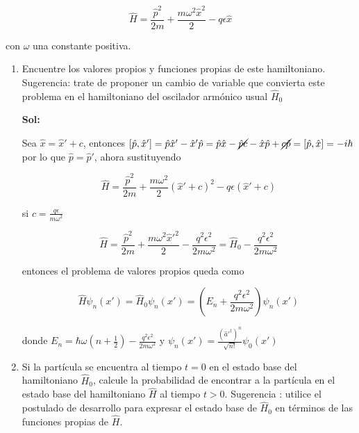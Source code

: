 \documentclass[12pt,a4paper]{article}
\begin{document}
\begin{enumerate}
\begin{equation*}
    \hat{H} = \frac{\hat{p}^2}{2m} + \frac{m \omega^2 \hat{x}^2}{2} - q \epsilon \hat{x}
\end{equation*}

con $\omega$ una constante positiva.

\begin{enumerate}
    \item Encuentre los valores propios y funciones propias de este hamiltoniano. Sugerencia: trate de proponer un cambio de variable que convierta este problema en el hamiltoniano  del oscilador armónico usual $\hat{H}_0$
    
    \textbf{Sol:}
    
    Sea $\hat{x} = \hat{x}' + c$, entonces $[\hat{p},\hat{x}'] = \hat{p}\hat{x}' - \hat{x}'\hat{p} = \hat{p} \hat{x} - \cancel{\hat{p}c} - \hat{x} \hat{p} + \cancel{c\hat{p}} = [\hat{p},\hat{x}] = - i\hbar$ por lo que $\hat{p} = \hat{p}'$, ahora sustituyendo
    
    \begin{equation*}
        \hat{H} = \frac{\hat{p}^2}{2m} + \frac{m \omega^2}{2}(\hat{x}' + c)^2 - q\epsilon (\hat{x}' + c)
    \end{equation*}
    
    si $c= \frac{q \epsilon}{m \omega^2}$
    
    \begin{equation*}
        \hat{H} = \frac{\hat{p}^2}{2m}+\frac{m \omega^2 \hat{x}'^2}{2} - \frac{q^2 \epsilon^2}{2m \omega^2} = \hat{H}_0 -\frac{q^2 \epsilon^2}{2m \omega^2}
    \end{equation*}
    
    entonces el problema de valores propios queda como
    
    \begin{equation*}
        \hat{H} \psi_{n} (x') =\hat{H}_0 \psi_{n}(x') = (E_n + \frac{q^2 \epsilon^2}{2m \omega^2}) \psi_{n} (x') 
    \end{equation*}
    
    donde $E_n = \hbar \omega (n + \frac{1}{2}) - \frac{q^2 \epsilon^2}{2m \omega^2}$ y $\psi_{n}(x') = \frac{(\hat{a}'^{\dagger})^n}{\sqrt{n!}} \psi_0 (x')$
    
    
    \item Si la partícula se encuentra al tiempo $t=0$ en el estado base del hamiltoniano $\hat{H}_0$, calcule la probabilidad de encontrar a la partícula en el estado base del hamiltoniano $\hat{H}$ al tiempo $t>0$. Sugerencia : utilice el postulado de desarrollo para expresar el estado base de $\hat{H}_0$ en términos de las funciones propias de $\hat{H}$.
    

\end{enumerate}
\end{enumerate}
\end{document}
